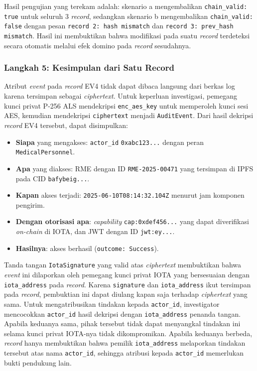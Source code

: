 Hasil pengujian yang terekam adalah: skenario a mengembalikan
\texttt{chain\_valid: true} untuk seluruh 3 \textit{record}, sedangkan skenario
b mengembalikan \texttt{chain\_valid: false} dengan pesan \texttt{record 2:
hash mismatch} dan \texttt{record 3: prev\_hash mismatch}. Hasil ini membuktikan bahwa modifikasi pada suatu \textit{record} terdeteksi
secara otomatis melalui efek domino pada \textit{record} sesudahnya.
 
\subsubsection{Langkah 5: Kesimpulan dari Satu Record}
 
Atribut \textit{event} pada \textit{record} EV4 tidak dapat dibaca langsung
dari berkas log karena tersimpan sebagai \textit{ciphertext}. Untuk keperluan
investigasi, pemegang kunci privat P-256 ALS mendekripsi \texttt{enc\_aes\_key}
untuk memperoleh kunci sesi AES, kemudian mendekripsi \texttt{ciphertext}
menjadi \texttt{AuditEvent}. Dari hasil dekripsi \textit{record} EV4 tersebut,
dapat disimpulkan:
 
\begin{itemize}
    \item \textbf{Siapa} yang mengakses: \texttt{actor\_id}
    \texttt{0xabc123...} dengan peran \texttt{MedicalPersonnel}.
    \item \textbf{Apa} yang diakses: RME dengan ID \texttt{RME-2025-00471}
    yang tersimpan di IPFS pada CID \texttt{bafybeig...}.
    \item \textbf{Kapan} akses terjadi: \texttt{2025-06-10T08:14:32.104Z}
    menurut jam komponen pengirim.
    \item \textbf{Dengan otorisasi apa}: \textit{capability}
    \texttt{cap:0xdef456...} yang dapat diverifikasi \textit{on-chain} di IOTA,
    dan JWT dengan ID \texttt{jwt:ey...}.
    \item \textbf{Hasilnya}: akses berhasil (\texttt{outcome: Success}).
\end{itemize}
 
Tanda tangan \texttt{IotaSignature} yang valid atas \textit{ciphertext}
membuktikan bahwa \textit{event} ini dilaporkan oleh pemegang kunci privat
IOTA yang bersesuaian dengan \texttt{iota\_address} pada \textit{record}.
Karena \texttt{signature} dan \texttt{iota\_address} ikut tersimpan pada
\textit{record}, pembuktian ini dapat diulang kapan saja terhadap
\textit{ciphertext} yang sama. Untuk mengatribusikan tindakan kepada
\texttt{actor\_id}, investigator mencocokkan \texttt{actor\_id} hasil dekripsi
dengan \texttt{iota\_address} penanda tangan. Apabila keduanya sama, pihak
tersebut tidak dapat menyangkal tindakan ini selama kunci privat IOTA-nya tidak
dikompromikan. Apabila keduanya berbeda, \textit{record} hanya membuktikan bahwa
pemilik \texttt{iota\_address} melaporkan tindakan tersebut atas nama
\texttt{actor\_id}, sehingga atribusi kepada \texttt{actor\_id} memerlukan
bukti pendukung lain.

